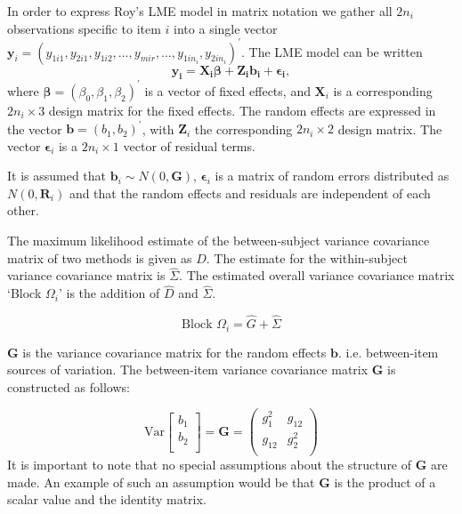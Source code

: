 In order to express Roy's LME model in matrix notation we gather all $2n_i$ observations specific to item $i$ into a single vector  $\boldsymbol{y}_{i} = (y_{1i1},y_{2i1},y_{1i2},\ldots,y_{mir},\ldots,y_{1in_{i}},y_{2in_{i}})^\prime.$ The LME model can be written
\[
\boldsymbol{y_{i}} = \boldsymbol{X_{i}\beta} + \boldsymbol{Z_{i}b_{i}} + \boldsymbol{\epsilon_{i}},
\]
where $\boldsymbol{\beta}=(\beta_0,\beta_1,\beta_2)^\prime$ is a vector of fixed effects, and $\boldsymbol{X}_i$ is a corresponding $2n_i\times 3$ design matrix for the fixed effects. The random effects are expressed in the vector $\boldsymbol{b}=(b_1,b_2)^\prime$, with $\boldsymbol{Z}_i$ the corresponding $2n_i\times 2$ design matrix. The vector $\boldsymbol{\epsilon}_i$ is a $2n_i\times 1$ vector of residual terms.

It is assumed that $\boldsymbol{b}_i \sim N(0,\boldsymbol{G})$, $\boldsymbol{\epsilon}_i$ is a matrix of random errors distributed as $N(0,\boldsymbol{R}_i)$ and that the random effects and residuals are independent of each other.

The maximum likelihood estimate of the between-subject variance covariance matrix of two methods is given as $D$. The estimate for
the within-subject variance covariance matrix is $\hat{\Sigma}$. The estimated overall variance covariance matrix `Block
$\Omega_{i}$' is the addition of $\hat{D}$ and $\hat{\Sigma}$.

\begin{equation}
\mbox{Block  }\Omega_{i} = \hat{G} + \hat{\Sigma}
\end{equation}

$\boldsymbol{G}$ is the variance covariance matrix for the random effects $\boldsymbol{b}$.
i.e. between-item sources of variation. The between-item variance covariance matrix $\boldsymbol{G}$ is constructed as follows:

\[ \mbox{Var}  \left[
\begin{array}{c}
b_1   \\
b_2  \\
\end{array}
\right] =  \boldsymbol{G} =\left(
\begin{array}{cc}
g^2_1  & g_{12} \\
g_{12} & g^2_2 \\
\end{array}
\right) \]
It is important to note that no special assumptions about the structure of $\boldsymbol{G}$ are made. An example of such an assumption would be that $\boldsymbol{G}$ is the product of a scalar value and the identity matrix.

